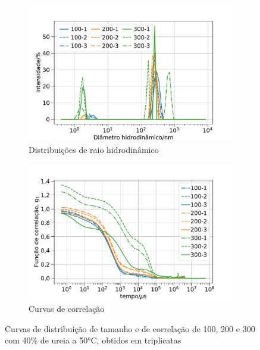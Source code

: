 \begin{figure}[h]
	\begin{subfigure}{0.50\textwidth}
		\centering
		\includegraphics[width=\textwidth]{imagens/dls/ctab_distrib}
		\caption{Distribuições de raio hidrodinâmico}
		\label{fig:DLS_ctab_distrib}
	\end{subfigure} %
	\begin{subfigure}{0.50\textwidth}
		\centering
		\includegraphics[width=\textwidth]{imagens/dls/ctab_CC}
		\caption{Curvas de correlação}
		\label{fig:DLS_ctab_cc}
	\end{subfigure}
	\caption{Curvas de distribuição de tamanho e de correlação de \CTAB{} 100, 200 e 300 \mM{} com 40\% de ureia a 50°C, obtidos em triplicatas}
	\label{fig:DLS_ctab}
\end{figure}

